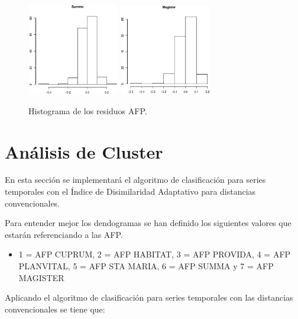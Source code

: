 \begin{figure}[!htp]
\begin{center}
  \includegraphics[height=4cm, width=4cm]{grafico6.eps}
  \includegraphics[height=4cm, width=4cm]{grafico7.eps}
   \caption{Histograma de los residuos AFP.}
\label{caja}
\end{center}
\end{figure}

\section{An\'alisis de Cluster}
En esta secci\'on se implementar\'a el algoritmo de clasificaci\'on para series temporales con el \'Indice de Disimilaridad Adaptativo para distancias convencionales.

Para entender mejor los dendogramas se han definido los siguientes valores que estar\'an re\-fe\-ren\-cian\-do a las AFP.

\begin{itemize}
\item 1 = AFP CUPRUM, 2 = AFP HABITAT, 3 = AFP PROVIDA, 4 = AFP PLANVITAL, 5 = AFP STA MARIA, 6 = AFP SUMMA y 7 = AFP MAGISTER
\end{itemize}

Aplicando el algoritmo de clasificaci\'on para series temporales con las distancias convencionales se tiene que:

